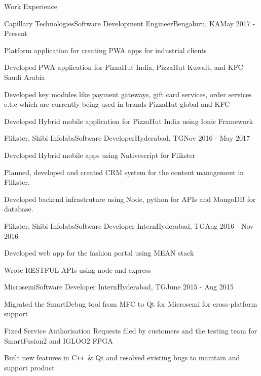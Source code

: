 \documentclass{article}
\newlength{\tabin}
\newlength{\secsep}
\def\Plus{\texttt{+}}
\newcommand{\lineunder}{\vspace*{-8pt} \\ \hspace*{-6pt} \hrulefill \\ \vspace*{-15pt}}
\newenvironment{tabbedsection}[1]{
  \begin{list}{}{
      \setlength{\itemsep}{0pt}
      \setlength{\labelsep}{0pt}
      \setlength{\labelwidth}{0pt}
      \setlength{\leftmargin}{\tabin}
      \setlength{\rightmargin}{\tabin}
      \setlength{\listparindent}{0pt}
      \setlength{\parsep}{0pt}
      \setlength{\parskip}{0pt}
      \setlength{\partopsep}{0pt}
      \setlength{\topsep}{#1}
    }
  \item[]
}{\end{list}}
\newenvironment{resume_section}[1]{
  \filbreak
  \vspace{2\secsep}
  \textsc{\large#1}
  \lineunder
  \begin{tabbedsection}{\secsep}
}{\end{tabbedsection}}
\newenvironment{subitems}{
  \renewcommand{\labelitemi}{-}
  \begin{itemize}
      \setlength{\labelsep}{1em}
}{\end{itemize}}
\newenvironment{resume_employer}[4]{
  \vspace{\secsep}
  \textbf{#1} \\ 
  \indent {\small #2} \hfill {\footnotesize#3 (#4)}
  \begin{tabbedsection}{0pt}
  \begin{subitems}
}{\end{subitems}\end{tabbedsection}}
\begin{document}
\begin{resume_section}{\color{myblue}Work Experience}
  \begin{resume_employer}{Capillary Technologies}{Software Development Engineer}{Bengaluru, KA}{May 2017 - Present}
    \item Platform application for creating PWA apps for industrial clients
    \item Developed PWA application for PizzaHut India, PizzaHut Kuwait, and KFC Saudi Arabia
    \item Developed key modules like payment gateways, gift card services, order services e.t.c which are currently being used in brands PizzaHut global and KFC
    \item Developed Hybrid mobile application for PizzaHut India using Ionic Framework
  \end{resume_employer}
  
  \begin{resume_employer}{Flikster, Shibi Infolabs}{Software Developer}{Hyderabad, TG}{Nov 2016 - May 2017}
    \item Developed Hybrid mobile apps using Nativescript for Flikster
    \item Planned, developed and created CRM system for the content management in Flikster.
    \item Developed backend infrastruture using Node, python for APIs and MongoDB for database.
  \end{resume_employer}
  
  \begin{resume_employer}{Flikster, Shibi Infolabs}{Software Developer Intern}{Hyderabad, TG}{Aug 2016 - Nov 2016}
    \item Developed web app for the fashion portal using MEAN stack
    \item Wrote RESTFUL APIs using node and express
  \end{resume_employer}
  
  \begin{resume_employer}{Microsemi}{Software Developer Intern}{Hyderabad, TG}{June 2015 - Aug 2015}
    \item Migrated the SmartDebug tool from MFC to Qt for Microsemi for cross-platform support
    \item Fixed Service Authorisation Requests filed by customers and the testing team for SmartFusion2 and IGLOO2 FPGA
    \item Built new features in C\Plus\Plus\ \& Qt and resolved existing bugs to maintain and support product
  \end{resume_employer}
\end{resume_section}
\end{document}

